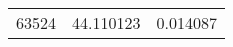 \documentclass[a4paper,9pt]{beamer}
\begin{document}
{\begin{table}[htbp]
\begin{minipage}{0.5\linewidth}
\begin{tabular}{|l|l|l|}
\hline
63524&44.110123&0.014087\\


\end{tabular}
\end{minipage}
\end{table}}
\end{document}
